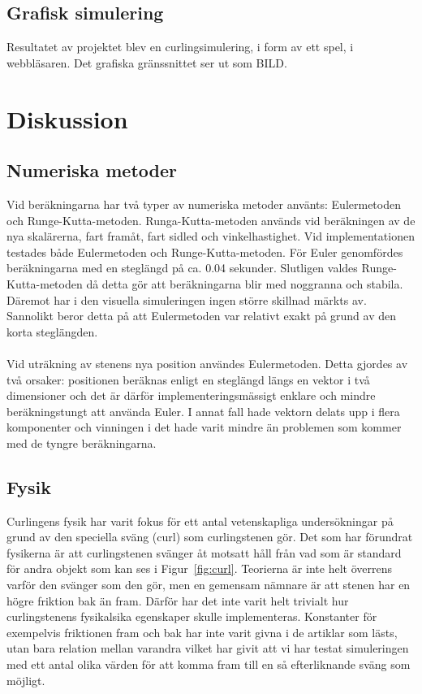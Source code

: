 \documentclass[11pt]{article} %
\begin{document}
\subsection{Grafisk simulering}
Resultatet av projektet blev en curlingsimulering, i form av ett spel, i webbläsaren. Det grafiska gränssnittet ser ut som BILD.


\section{Diskussion}

\subsection{Numeriska metoder}
Vid beräkningarna har två typer av numeriska metoder använts: Eulermetoden och
Runge-Kutta-metoden. Runga-Kutta-metoden används vid beräkningen av de nya skalärerna,
fart framåt, fart sidled och vinkelhastighet.
Vid implementationen testades både Eulermetoden och Runge-Kutta-metoden. 
För Euler genomfördes beräkningarna med en steglängd på ca. 0.04 sekunder. 
Slutligen valdes Runge-Kutta-metoden då detta gör att beräkningarna blir med noggranna och stabila. 
Däremot har i den visuella simuleringen ingen större skillnad märkts av. Sannolikt beror detta på att Eulermetoden var relativt exakt på grund av den korta steglängden. 
\\\\Vid uträkning av stenens nya position användes Eulermetoden. 
Detta gjordes av två orsaker: positionen beräknas enligt en steglängd längs en vektor i två dimensioner och det är därför implementeringsmässigt enklare och mindre beräkningstungt att använda Euler. 
I annat fall hade vektorn delats upp i flera komponenter och vinningen i det hade varit mindre än problemen som kommer med de tyngre beräkningarna. 

\subsection{Fysik}
Curlingens fysik har varit fokus för ett antal vetenskapliga undersökningar på grund av den speciella sväng (curl) som curlingstenen gör. Det som har förundrat fysikerna är att curlingstenen svänger åt motsatt håll från vad som är standard för andra objekt som kan ses i Figur~\ref{fig:curl}. Teorierna är inte helt överrens varför den svänger som den gör, men en gemensam nämnare är att stenen har en högre friktion bak än fram. Därför har det inte varit helt trivialt hur curlingstenens fysikalsika egenskaper skulle implementeras. Konstanter för exempelvis friktionen fram och bak har inte varit givna i de artiklar som lästs, utan bara relation mellan varandra vilket har givit att vi har testat simuleringen med ett antal olika värden för att komma fram till en så efterliknande sväng som möjligt.
\end{document}
